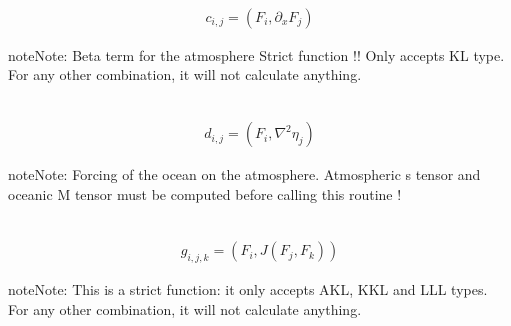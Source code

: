 \documentclass[letterpaper,10pt,english]{sphinxmanual}
\begin{document}
\begin{fulllineitems}
\begin{fulllineitems}
\end{fulllineitems}


\begin{fulllineitems}
\label{rstfiles/inprod_analytic:inprod_analytic.atm_tensors.calculate_c_atm}~\begin{equation*}
\begin{split}c_{i,j} = (F_i, \partial_x F_j)\end{split}
\end{equation*}
\begin{notice}{note}{Note:}
Beta term for the atmosphere
Strict function !! Only accepts KL type.
For any other combination, it will not calculate anything.
\end{notice}

\end{fulllineitems}


\begin{fulllineitems}
\label{rstfiles/inprod_analytic:inprod_analytic.atm_tensors.calculate_d}~\begin{equation*}
\begin{split}d_{i,j} = (F_i, \nabla^2 \eta_j)\end{split}
\end{equation*}
\begin{notice}{note}{Note:}
Forcing of the ocean on the atmosphere.
Atmospheric s tensor and oceanic M tensor must be computed
before calling this routine !
\end{notice}

\end{fulllineitems}


\begin{fulllineitems}
\label{rstfiles/inprod_analytic:inprod_analytic.atm_tensors.calculate_g}~\begin{equation*}
\begin{split}g_{i,j,k} = (F_i, J(F_j, F_k))\end{split}
\end{equation*}
\begin{notice}{note}{Note:}
This is a strict function: it only accepts AKL, KKL
and LLL types.
For any other combination, it will not calculate anything.
\end{notice}


\end{fulllineitems}
\end{fulllineitems}
\end{document}
